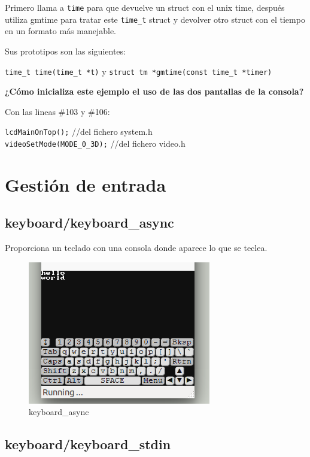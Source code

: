 \documentclass[12pt,english]{article}
\begin{document}
    Primero llama a \texttt{time} para que devuelve un struct con el unix time, después utiliza gmtime para tratar este \texttt{time\_t} struct y devolver otro struct con el tiempo en un formato más manejable.

    Sus prototipos son las siguientes:

    \texttt{time\_t time(time\_t *t)} y 
    \texttt{struct tm *gmtime(const time\_t *timer)}


    \textbf{¿Cómo inicializa este ejemplo el uso de las dos pantallas de la consola?}

    Con las lineas \#103 y \#106:

    \texttt{lcdMainOnTop();} //del fichero system.h\\
    \texttt{videoSetMode(MODE\_0\_3D);} //del fichero video.h

    \section{Gestión de entrada}

    \subsection{keyboard/keyboard\_async}

    Proporciona un teclado con una consola donde aparece lo que se teclea.

    \begin{figure}[H] 
    \centering
    \includegraphics[scale=0.5]{images/keyboard_async}
    \caption{keyboard\_async}
    \end{figure}

    \newpage

    \subsection{keyboard/keyboard\_stdin}
\end{document}
